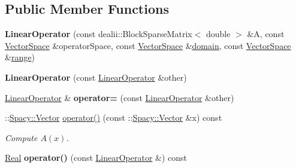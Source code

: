 \subsection*{\-Public \-Member \-Functions}
\begin{DoxyCompactItemize}
\item 
\hypertarget{classSpacy_1_1dealII_1_1LinearOperator_a89fd9fc3d0ca62efa4c94c023d2986cd}{{\bfseries \-Linear\-Operator} (const dealii\-::\-Block\-Sparse\-Matrix$<$ double $>$ \&\-A, const \hyperlink{classSpacy_1_1VectorSpace}{\-Vector\-Space} \&operator\-Space, const \hyperlink{classSpacy_1_1VectorSpace}{\-Vector\-Space} \&\hyperlink{classSpacy_1_1OperatorBase_a2588f9b3e0188820c4c494e63293dc6f}{domain}, const \hyperlink{classSpacy_1_1VectorSpace}{\-Vector\-Space} \&\hyperlink{classSpacy_1_1OperatorBase_ab19d3b7a6f290b1079248f1e567e53d6}{range})}\label{classSpacy_1_1dealII_1_1LinearOperator_a89fd9fc3d0ca62efa4c94c023d2986cd}

\item 
\hypertarget{classSpacy_1_1dealII_1_1LinearOperator_a18a77229674a6d7be21aee1e199734a7}{{\bfseries \-Linear\-Operator} (const \hyperlink{classSpacy_1_1dealII_1_1LinearOperator}{\-Linear\-Operator} \&other)}\label{classSpacy_1_1dealII_1_1LinearOperator_a18a77229674a6d7be21aee1e199734a7}

\item 
\hypertarget{classSpacy_1_1dealII_1_1LinearOperator_ae0ce5b35ba269b997f64dd483750aff9}{\hyperlink{classSpacy_1_1dealII_1_1LinearOperator}{\-Linear\-Operator} \& {\bfseries operator=} (const \hyperlink{classSpacy_1_1dealII_1_1LinearOperator}{\-Linear\-Operator} \&other)}\label{classSpacy_1_1dealII_1_1LinearOperator_ae0ce5b35ba269b997f64dd483750aff9}

\item 
\-::\hyperlink{classSpacy_1_1Vector}{\-Spacy\-::\-Vector} \hyperlink{classSpacy_1_1dealII_1_1LinearOperator_a5874d400fdc11be1a2f8f45d3d4969fa}{operator()} (const \-::\hyperlink{classSpacy_1_1Vector}{\-Spacy\-::\-Vector} \&x) const 
\begin{DoxyCompactList}\small\item\em \-Compute $A(x)$. \end{DoxyCompactList}\item 
\hypertarget{classSpacy_1_1dealII_1_1LinearOperator_a9adc85435d04c2da0e35e41690c41c08}{\hyperlink{classSpacy_1_1Real}{\-Real} {\bfseries operator()} (const \hyperlink{classSpacy_1_1dealII_1_1LinearOperator}{\-Linear\-Operator} \&) const }\label{classSpacy_1_1dealII_1_1LinearOperator_a9adc85435d04c2da0e35e41690c41c08}


\end{DoxyCompactItemize}
